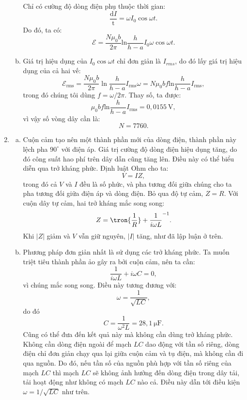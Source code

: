 \begin{loigiai}
\begin{enumerate}[1.]
\begin{enumerate}[a)]
$$$$
Chỉ có cường độ dòng điện phụ thuộc thời gian:
$$\dfrac{\mathrm{d}I}{\mathrm{t}}=\omega I_0 \cos\omega t.$$
Do đó, ta có:
$$\mathcal{E}=\dfrac{N\mu_0b}{2\pi}\mathrm{ln}\dfrac{h}{h-a}I_0\omega\cos\omega t.$$
\item Giá trị hiệu dụng của $I_0\cos \omega t$ chỉ đơn giản là $I_{rms}$, do đó lấy giá trị hiệu dụng của cả hai vế:
$$\mathcal{E_{\mathrm{rms}}}=\dfrac{N\mu_0b}{2\pi}\ln\dfrac{h}{h-a}I_{\mathrm{rms}} \omega=N\mu_0bf\mathrm{ln}\dfrac{h}{h-a}I_\mathrm{rms},$$
trong đó chúng tôi dùng $f=\omega/2\pi$. Thay số, ta được:
$$\mu_0 bf\mathrm{ln}\dfrac{h}{h-a}I_\mathrm{rms}=0,0155~\mathrm{V},$$
vì vậy số vòng dây cần là:
$$N=7760.$$
    \end{enumerate}
    \item 
    \begin{enumerate}[a.]
        \item Cuộn cảm tạo nên một thành phần mới của dòng điện, thành phần này lệch pha $90^\circ$ với điện áp. Giá trị cường độ dòng điện hiệu dụng tăng, do đó công suất hao phí trên dây dẫn cũng tăng lên. Điều này có thể biểu diễn qua trở kháng phức. Định luật Ohm cho ta:
        $$V=IZ,$$
        trong đó cả $V$ và $I$ đều là số phức, và pha tương đối giữa chúng cho ta pha tương đối giữa điện áp và dòng điện. Bỏ qua độ tự cảm, $Z=R$. Với cuộn dây tự cảm, hai trở kháng mắc song song:
        $$Z=\tron{\dfrac{1}{R}}+\dfrac{1}{i\omega L}^{-1}.$$
        Khi $\left|Z\right|$ giảm và $V$ vẫn giữ nguyên, $\left|I\right|$ tăng, như đã lập luận ở trên.
        \item Phương pháp đơn giản nhất là sử dụng các trở kháng phức. Ta muốn triệt tiêu thành phần ảo gây ra bởi cuộn cảm, nên ta cần:
        $$\dfrac{1}{i\omega L}+i\omega C=0,$$
        vì chúng mắc song song. Điều này tương đương với:
        $$\omega=\dfrac{1}{\sqrt{LC}},$$
        do đó
        $$C=\dfrac{1}{\omega^2 L}=28,1 ~\mathrm{\mu F}.$$
        Cũng có thể đưa đến kết quả này mà không cần dùng trở kháng phức. Không cần dòng điện ngoài để mạch $LC$ dao động với tần số riêng, dòng điện chỉ đơn giản chạy qua lại giữa cuộn cảm và tụ điện, mà không cần đi qua nguồn. Do đó, nếu tần số của nguồn phù hợp với tần số riêng của mạch $LC$ thì mạch $LC$ sẽ không ảnh hưởng đến dòng điện trong dây tải, tải hoạt động như không có mạch $LC$ nào cả. Điều này dẫn tới điều kiện $\omega=1/\sqrt{LC}$ như trên.
    \end{enumerate}
\end{enumerate}
\end{loigiai}


